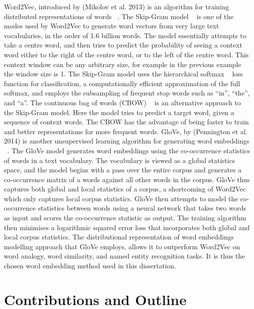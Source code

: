 Word2Vec, introduced by (Mikolov et al. 2013) is an algorithm for training distributed representations of words ~\citep{mikolov2013distributed}. The Skip-Gram model ~\citep{mikolov2013efficient} is one of the modes used by Word2Vec to generate word vectors from very large text vocabularies, in the order of 1.6 billion words. The model essentially attempts to take a centre word, and then tries to predict the probability of seeing a context word either to the right of the centre word, or to the left of the centre word. This context window can be any arbitrary size, for example in the previous example the window size is 1. The Skip-Gram model uses the hierarchical softmax ~\citep{morin2005hierarchical} loss function for classification, a computationally efficient approximation of the full softmax, and employs the subsampling of frequent stop words such as “in”, “the”, and “a”. The continuous bag of words (CBOW) ~\citep{mikolov2013efficient} is an alternative approach to the Skip-Gram model. Here the model tries to predict a target word, given a sequence of context words. The CBOW has the advantage of being faster to train and better representations for more frequent words. \newline
GloVe, by (Pennington et al. 2014) is another unsupervised learning algorithm for generating word embeddings ~\citep{pennington2014glove}. The GloVe model generates word embeddings using the co-occurrence statistics of words in a text vocabulary. The vocabulary is viewed as a global statistics space, and the model begins with a pass over the entire corpus and generates a co-occurrence matrix of a words against all other words in the corpus. GloVe thus captures both global and local statistics of a corpus, a shortcoming of Word2Vec which only captures local corpus statistics. GloVe then attempts to model the co-occurrence statistics between words using a neural network that takes two words as input and scores the co-occurrence statistic as output. The training algorithm then minimises a logarithmic squared error loss that incorporates both global and local corpus statistics. The distributional representation of word embeddings modelling approach that GloVe employs, allows it to outperform Word2Vec on word analogy, word similarity, and named entity recognition tasks. It is thus the chosen word embedding method used in this dissertation.



\section{Contributions and Outline} %

